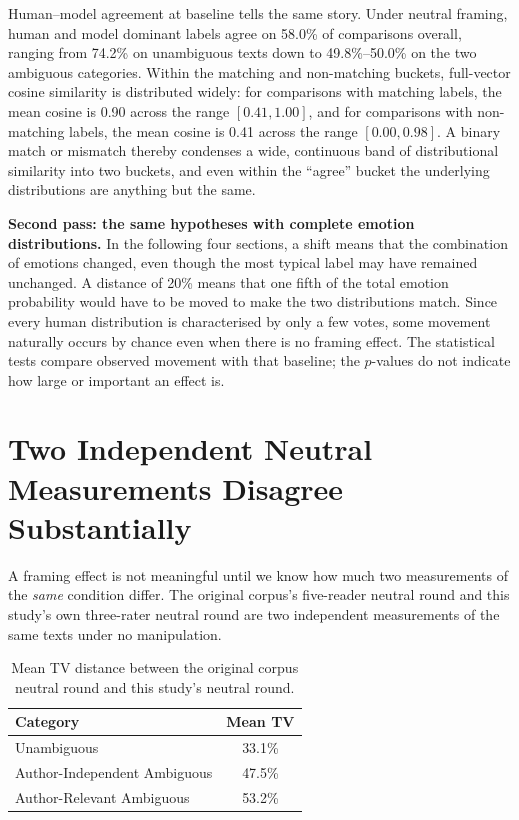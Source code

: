 Human--model agreement at baseline tells the same story. Under neutral framing, human
and model dominant labels agree on 58.0\% of comparisons overall, ranging from 74.2\% on
unambiguous texts down to 49.8\%--50.0\% on the two ambiguous categories. Within the
matching and non-matching buckets, full-vector cosine similarity is distributed widely: for
comparisons with matching labels, the mean cosine is 0.90 across the range $[0.41, 1.00]$, and for
comparisons with non-matching labels, the mean cosine is 0.41 across the range $[0.00, 0.98]$. A
binary match or mismatch thereby condenses a wide, continuous band of distributional similarity
into two buckets, and even within the ``agree'' bucket the underlying distributions are anything
but the same.

\noindent
\textbf{Second pass: the same hypotheses with complete emotion distributions.} In the following
four sections, a shift means that the combination of emotions changed, even though the most
typical label may have remained unchanged. A distance of 20\% means that one fifth of the total
emotion probability would have to be moved to make the two distributions match. Since every human
distribution is characterised by only a few votes, some movement naturally occurs by chance even
when there is no framing effect. The statistical tests compare observed movement with that
baseline; the $p$-values do not indicate how large or important an effect is.

\section{Two Independent Neutral Measurements Disagree Substantially}
\label{res:baseline_validation}

\noindent
A framing effect is not meaningful until we know how much two measurements of the \emph{same}
condition differ. The original corpus's five-reader neutral round and this study's own
three-rater neutral round are two independent measurements of the same texts under no
manipulation.

\begin{table}[h]
\centering
\footnotesize
\caption{Mean TV distance between the original corpus neutral round and this study's neutral round.}
\label{tab:baselinevalidation}
\begin{tabular}{lc}
\hline
\textbf{Category} & \textbf{Mean TV} \\
\hline
Unambiguous & 33.1\% \\
Author-Independent Ambiguous & 47.5\% \\
Author-Relevant Ambiguous & 53.2\% \\
\hline
\end{tabular}
\end{table}

